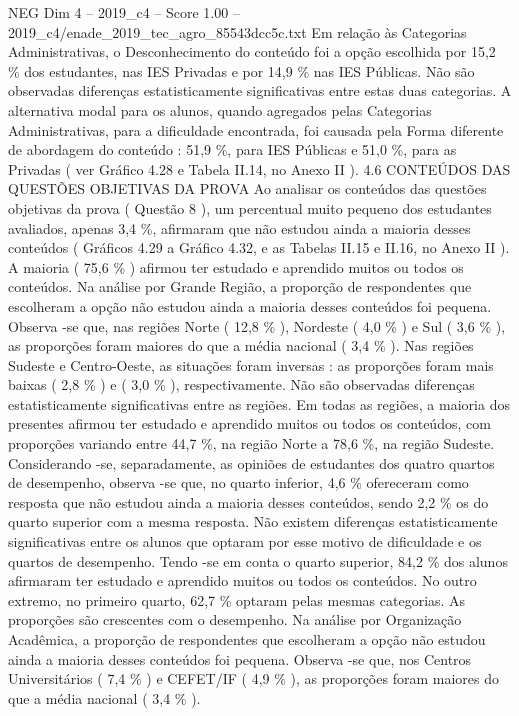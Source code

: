 \begin{textsample}{NEG Dim 4 – 2019\_c4 – Score 1.00 – 2019\_c4/enade\_2019\_tec\_agro\_85543dcc5c.txt}
Em relação às Categorias Administrativas, o Desconhecimento do conteúdo foi a opção escolhida por 15,2 \% dos estudantes, nas IES Privadas e por 14,9 \% nas IES Públicas.
Não são observadas diferenças estatisticamente significativas entre estas duas categorias.
A alternativa modal para os alunos, quando agregados pelas Categorias Administrativas, para a dificuldade encontrada, foi causada pela Forma diferente de abordagem do conteúdo : 51,9 \%, para IES Públicas e 51,0 \%, para as Privadas ( ver Gráfico 4.28 e Tabela II.14, no Anexo II ). 4.6 CONTEÚDOS DAS QUESTÕES OBJETIVAS DA PROVA Ao analisar os conteúdos das questões objetivas da prova ( Questão 8 ), um percentual muito pequeno dos estudantes avaliados, apenas 3,4 \%, afirmaram que não estudou ainda a maioria desses conteúdos ( Gráficos 4.29 a Gráfico 4.32, e as Tabelas II.15 e II.16, no Anexo II ).
A maioria ( 75,6 \% ) afirmou ter estudado e aprendido muitos ou todos os conteúdos.
Na análise por Grande Região, a proporção de respondentes que escolheram a opção não estudou ainda a maioria desses conteúdos foi pequena.
Observa -se que, nas regiões Norte ( 12,8 \% ), Nordeste ( 4,0 \% ) e Sul ( 3,6 \% ), as proporções foram maiores do que a média nacional ( 3,4 \% ).
Nas regiões Sudeste e Centro-Oeste, as situações foram inversas : as proporções foram mais baixas ( 2,8 \% ) e ( 3,0 \% ), respectivamente.
Não são observadas diferenças estatisticamente significativas entre as regiões.
Em todas as regiões, a maioria dos presentes afirmou ter estudado e aprendido muitos ou todos os conteúdos, com proporções variando entre 44,7 \%, na região Norte a 78,6 \%, na região Sudeste.
Considerando -se, separadamente, as opiniões de estudantes dos quatro quartos de desempenho, observa -se que, no quarto inferior, 4,6 \% ofereceram como resposta que não estudou ainda a maioria desses conteúdos, sendo 2,2 \% os do quarto superior com a mesma resposta.
Não existem diferenças estatisticamente significativas entre os alunos que optaram por esse motivo de dificuldade e os quartos de desempenho.
Tendo -se em conta o quarto superior, 84,2 \% dos alunos afirmaram ter estudado e aprendido muitos ou todos os conteúdos.
No outro extremo, no primeiro quarto, 62,7 \% optaram pelas mesmas categorias.
As proporções são crescentes com o desempenho.
Na análise por Organização Acadêmica, a proporção de respondentes que escolheram a opção não estudou ainda a maioria desses conteúdos foi pequena.
Observa -se que, nos Centros Universitários ( 7,4 \% ) e CEFET/IF ( 4,9 \% ), as proporções foram maiores do que a média nacional ( 3,4 \% ).

\end{textsample}
